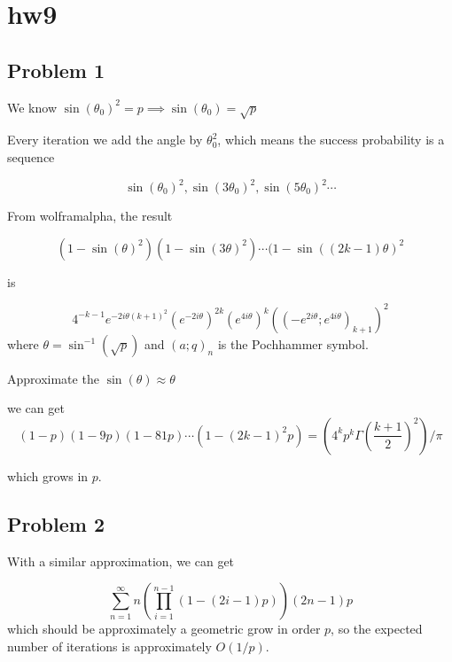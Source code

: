 \documentclass{article}%
\begin{document}
\section*{hw9}

\subsection*{Problem 1}

We know $\sin(\theta_0)^2=p\implies \sin(\theta_0)=\sqrt{p}$

Every iteration we add the angle by $\theta_0^2$, which means the success probability is a sequence

\[
    \sin(\theta_0)^2, \sin(3\theta_0)^2, \sin(5\theta_0)^2 \cdots
\]

From wolframalpha, the result

\[
    (1-\sin(\theta)^2)(1-\sin(3\theta)^2)\cdots(1-\sin((2k-1)\theta)^2
\]

is

\[
    4^{-k - 1} e^{-2 i \theta (k + 1)^2} (e^{-2 i \theta})^{2 k} (e^{4 i \theta})^k ((-e^{2 i \theta};e^{4 i \theta})_{k + 1})^2
\]
where $\theta=\sin^{-1}(\sqrt{p})$ and $(a;q)_n$ is the Pochhammer symbol.

Approximate the $\sin(\theta)\approx \theta$

we can get
\[
(1-p)(1-9p)(1-81p)\cdots (1-(2k-1)^2p)= (4^kp^k \Gamma(\frac{k+1}{2})^2)/\pi
\]

which grows in $p$.

\subsection*{Problem 2}

With a similar approximation, we can get

\[
    \sum\limits_{n=1}^{\infty} n\left(\prod_{i=1}^{n-1}(1-(2i-1)p)\right)(2n-1)p
\]
which should be approximately a geometric grow in order $p$, so the expected number of iterations is approximately $O(1/p)$.
\end{document}
